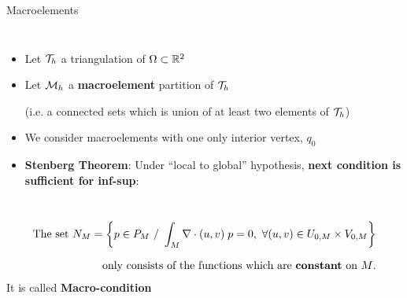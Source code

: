 \begin{frame}{Macroelements}
  \small
  \begin{columns}
    \begin{itemize}\itemsep0.1em
    \item Let ${\cal T}_h$ a triangulation of $\Omega\subset{\mathbb R}^2$
    \item Let ${\cal M}_h$ a \textbf{macroelement} partition of ${\cal T}_h$
      \begin{flushright}\scriptsize
        (i.e. a connected sets which is union of at least two
        elements of ${\cal T}_h$)
      \end{flushright}
    \item We consider macroelements with \alert{one
        only interior vertex}, $q_0$
    \item \textbf{Stenberg Theorem}: Under ``local to global''
      hypothesis, \alert{\textbf{next condition is sufficient for
          inf-sup}}:
    \end{itemize}
  \end{columns}
 \bigskip
  \begin{equation*}
    \begin{aligned}
      \text{The set $N_M=\left\{ p\in P_{M} \ / \  \int_M
          \nabla\cdot{}(u,v)\;p=0, \ \forall (u,v)\in
          U_{0,M}\times V_{0,M} \right\}$}
      \\[0.66em]
      \text{only consists of the functions which are \textbf{constant} on
        $M$}.
    \end{aligned}
  \end{equation*}
  It is called \textbf{Macro-condition}
\end{frame}


